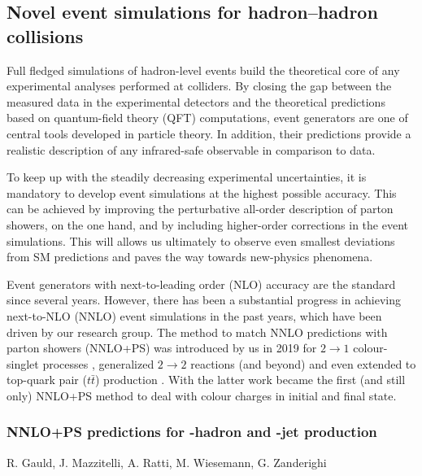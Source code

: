 \documentclass{FBR_Bericht_2025}
\begin{document}
\subsection{Novel event simulations for hadron--hadron collisions}
\begin{refsection}
Full fledged simulations of hadron-level events build the theoretical 
core of any experimental analyses performed at colliders.
By closing the gap between the measured data in the experimental
detectors and the theoretical predictions based on quantum-field theory
(QFT) computations, event generators are one of central tools developed
in particle theory. In addition, their predictions provide a realistic description
of any infrared-safe observable in comparison to data.

To keep up with the steadily decreasing experimental uncertainties, it is 
mandatory to develop event simulations at the highest possible accuracy.
This can be achieved by improving the perturbative all-order description 
of parton showers, on the one hand, and by including higher-order corrections
in the event simulations. This will allows us ultimately to observe even smallest
deviations from SM predictions and paves the way towards new-physics phenomena.

Event generators with next-to-leading order (NLO) accuracy are the standard since 
several years. However, there has been a substantial progress in achieving next-to-NLO
(NNLO) event simulations in the past years, which have been driven by our research
group. The \minnlo{} method to match NNLO predictions with parton showers (NNLO+PS)
was introduced by us in 2019 for $2\to 1$ colour-singlet 
processes \cite{Monni2019:whf,MonniXXX}, generalized $2\to 2$ reactions 
(and beyond) \cite{Lombardi:} and even extended to top-quark pair ($t\bar t$) production \cite{Mazzitelli, Mazzitelli}. With the latter work \minnlo{} became the first 
(and still only) NNLO+PS method to deal with colour charges in initial and final state.
%
\subsubsection[NNLO+PS predictions for $B$-hadron and $b$-jet production]{NNLO+PS predictions for -hadron and -jet production}

\begin{Namen}
R. Gauld, J. Mazzitelli, A. Ratti, M. Wiesemann, G. Zanderighi
\end{Namen}


\end{refsection}
\end{document}

